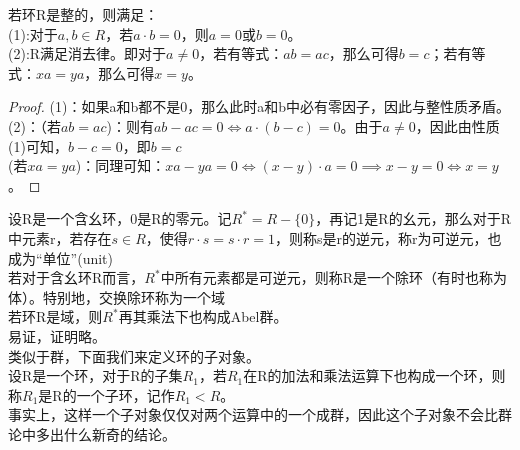 若环R是整的，则满足：\\
\indent (1):对于$a,b\in R$，若$a\cdot b=0$，则$a=0$或$b=0$。\\
\indent (2):R满足消去律。即对于$a\neq 0$，若有等式：$ab=ac$，那么可得$b=c$；若有等式：$xa=ya$，那么可得$x=y$。
\begin{proof}
(1)：如果a和b都不是0，那么此时a和b中必有零因子，因此与整性质矛盾。\\
(2)：（若$ab=ac$)：则有$ab-ac=0\iff a\cdot (b-c)=0$。由于$a\neq 0$，因此由性质(1)可知，$b-c=0$，即$b=c$\\
(若$xa=ya$)：同理可知：$xa-ya=0\iff (x-y)\cdot a=0\implies x-y=0\iff x=y$。
\end{proof}
设R是一个含幺环，0是R的零元。记$R^*=R-\{0\}$，再记1是R的幺元，那么对于R中元素r，若存在$s\in R$，使得$r\cdot s=s\cdot r=1$，则称s是r的逆元，称r为可逆元，也成为“单位”(unit)\\
若对于含幺环R而言，$R^*$中所有元素都是可逆元，则称R是一个除环（有时也称为体）。特别地，交换除环称为一个域\\
若环R是域，则$R^*$再其乘法下也构成Abel群。\\
易证，证明略。\\
\indent 类似于群，下面我们来定义环的子对象。\\
设R是一个环，对于R的子集$R_1$，若$R_1$在R的加法和乘法运算下也构成一个环，则称$R_1$是R的一个子环，记作$R_1<R$。\\
\indent 事实上，这样一个子对象仅仅对两个运算中的一个成群，因此这个子对象不会比群论中多出什么新奇的结论。

